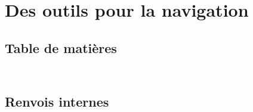 \section{Des outils pour la navigation}

\subsection{Table de matières}

\begin{slide}
  \inputminted{latex}{examples/toc.tex}
\end{slide}

\begin{slide}
  \inputminted{latex}{examples/minitoc.tex}
\end{slide}

\subsection{Renvois internes}
\begin{slide}
  \inputminted{latex}{examples/renvois.tex}
\end{slide}
